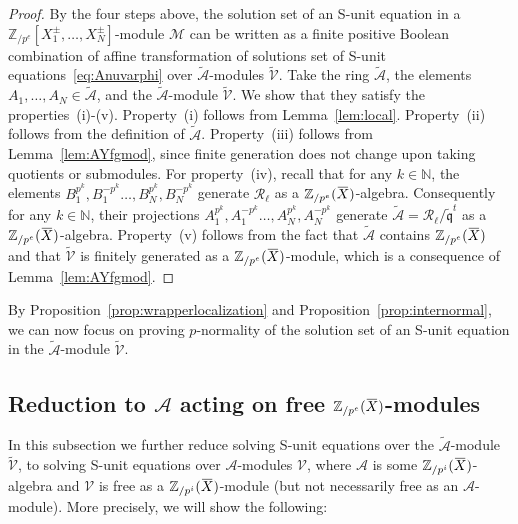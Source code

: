 \documentclass[letterpaper, 11pt, thm-restate]{article}
\numberwithin{equation}{section}
\newcommand{\N}{\mathbb{N}}
\newcommand{\Zpe}{\mathbb{Z}_{/p^e}}
\newcommand{\Zpi}{\mathbb{Z}_{/p^i}}
\newcommand{\mM}{\mathcal{M}}
\newcommand{\mV}{\mathcal{V}}
\newcommand{\mA}{\mathcal{A}}
\newcommand{\mR}{\mathcal{R}}
\newcommand{\tmA}{\widetilde{\mathcal{A}}}
\newcommand{\tmV}{\widetilde{\mathcal{V}}}
\newcommand{\oX}{\mkern 1.5mu\overline{\mkern-1.5mu X \mkern-1.5mu}\mkern 1.5mu}
\newcommand{\tfrq}{\widetilde{\mathfrak{q}}}
\theoremstyle{definition}
\theoremstyle{definition}
\theoremstyle{definition}
\begin{document}
\propwrapperlocalization*
\begin{proof}
    By the four steps above, the solution set of an S-unit equation in a $\Zpe[X_1^{\pm}, \ldots, X_N^{\pm}]$-module $\mM$ can be written as a finite positive Boolean combination of affine transformation of solutions set of S-unit equations~\eqref{eq:Anuvarphi} over $\tmA$-modules $\tmV$.
    Take the ring $\tmA$, the elements $A_1, \ldots, A_N \in \tmA$, and the $\tmA$-module $\tmV$.
    We show that they satisfy the properties~(i)-(v).
    Property~(i) follows from Lemma~\ref{lem:local}.
    Property~(ii) follows from the definition of $\tmA$.
    Property~(iii) follows from Lemma~\ref{lem:AYfgmod}, since finite generation does not change upon taking quotients or submodules.
    For property~(iv), recall that for any $k \in \N$, the elements $B_1^{p^k}, B_1^{-p^k} \ldots, B_N^{p^{k}}, B_N^{-p^{k}}$ generate $\mR_{\ell}$ as a $\Zpe(\oX)$-algebra.
    Consequently for any $k \in \N$, their projections $A_1^{p^k}, A_1^{-p^k} \ldots, A_N^{p^{k}}, A_N^{-p^{k}}$ generate $\tmA = \mR_{\ell}/\tfrq^t$ as a $\Zpe(\oX)$-algebra.
    Property~(v) follows from the fact that $\tmA$ contains $\Zpe(\oX)$ and that $\tmV$ is finitely generated as a $\Zpe(\oX)$-module, which is a consequence of Lemma~\ref{lem:AYfgmod}.
\end{proof}

By Proposition~\ref{prop:wrapperlocalization} and Proposition~\ref{prop:internormal}, we can now focus on proving $p$-normality of the solution set of an S-unit equation in the $\tmA$-module $\tmV$.

\subsection{Reduction to $\mA$ acting on free $\Zpe(\oX)$-modules}\label{subsec:free}

In this subsection we further reduce solving S-unit equations over the $\tmA$-module $\tmV$, to solving S-unit equations over $\mA$-modules $\mV$, where $\mA$ is some $\Zpi(\oX)$-algebra and $\mV$ is free as a $\Zpi(\oX)$-module (but not necessarily free as an $\mA$-module).
More precisely, we will show the following:
\end{document}
